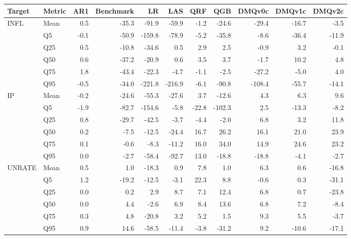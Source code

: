 \begin{tabular}{llrrrrrrrrr}
\toprule
Target & Metric & AR1 & Benchmark & LR & LAS & QRF & QGB & DMQv0c & DMQv1c & DMQv2c \\
\midrule
\multirow{6}{*}{INFL} & Mean & 0.5 & -35.3 & -91.9 & -59.9 & -1.2 & -24.6 & -29.4 & -16.7 & -3.5 \\
 & Q5 & -0.1 & -50.9 & -159.8 & -78.9 & -5.2 & -35.8 & -8.6 & -36.4 & -11.9 \\
 & Q25 & 0.5 & -10.8 & -34.6 & 0.5 & 2.9 & 2.5 & -0.9 & 3.2 & -0.1 \\
 & Q50 & 0.6 & -37.2 & -20.9 & 0.6 & 3.5 & 3.7 & -1.7 & 10.2 & 4.8 \\
 & Q75 & 1.8 & -43.4 & -22.3 & -4.7 & -1.1 & -2.5 & -27.2 & -5.0 & 4.0 \\
 & Q95 & -0.5 & -34.0 & -221.8 & -216.9 & -6.1 & -90.8 & -108.4 & -55.7 & -14.1 \\
\midrule
\multirow{6}{*}{IP} & Mean & -0.2 & -24.6 & -55.3 & -27.6 & 3.7 & -12.6 & 4.3 & 6.3 & 9.6 \\
 & Q5 & -1.9 & -82.7 & -154.6 & -5.8 & -22.8 & -102.3 & 2.5 & -13.3 & -8.2 \\
 & Q25 & 0.8 & -29.7 & -42.5 & -3.7 & -4.4 & -2.0 & 6.8 & 3.2 & 11.8 \\
 & Q50 & 0.2 & -7.5 & -12.5 & -24.4 & 16.7 & 26.2 & 16.1 & 21.0 & 23.9 \\
 & Q75 & 0.1 & -0.6 & -8.3 & -11.2 & 16.0 & 34.0 & 14.9 & 24.6 & 23.2 \\
 & Q95 & 0.0 & -2.7 & -58.4 & -92.7 & 13.0 & -18.8 & -18.8 & -4.1 & -2.7 \\
\midrule
\multirow{6}{*}{UNRATE} & Mean & 0.5 & 1.0 & -18.3 & 0.9 & 7.8 & 1.0 & 6.3 & 0.6 & -16.8 \\
 & Q5 & 1.2 & -19.2 & -12.5 & -3.1 & 22.3 & 8.8 & -0.6 & 0.3 & -31.1 \\
 & Q25 & 0.0 & 0.2 & 2.9 & 8.7 & 7.1 & 12.4 & 6.8 & 0.7 & -23.8 \\
 & Q50 & 0.0 & 4.4 & -2.6 & 6.9 & 8.4 & 13.6 & 6.8 & 7.2 & -8.4 \\
 & Q75 & 0.3 & 4.8 & -20.8 & 3.2 & 5.2 & 1.5 & 9.3 & 5.5 & -3.7 \\
 & Q95 & 0.9 & 14.6 & -58.5 & -11.4 & -3.8 & -31.2 & 9.2 & -10.6 & -17.1 \\
\bottomrule
\end{tabular}
